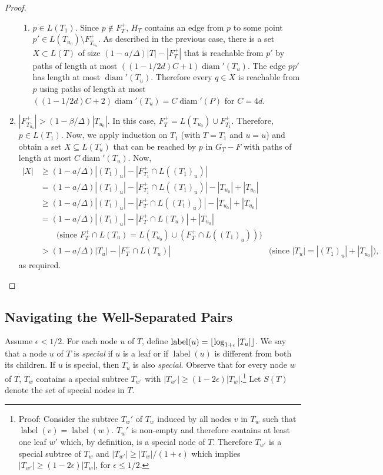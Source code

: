 \documentclass{patmorin}
\DeclareMathOperator{\diam}{diam}
\DeclareMathOperator{\lbl}{label}
\begin{document}
\begin{proof}
\begin{enumerate}
\begin{enumerate}
      \item $p\in L(T_1)$. Since $p\not\in F^+_T$, $H_T$ contains an edge
      from $p$ to some point $p'\in L(T_{u_0})\setminus F^+_{T_{u_0}}$.
      As described in the previous case, there is a set $X\subset
      L(T)$ of size $(1-a/\Delta)|T|-|F^+_{T}|$ that is reachable
      from $p'$ by paths of length at most $((1-1/2d)C+1)\diam'(T_u)$.
      The edge $pp'$ has length at most $\diam'(T_u)$. Therefore every
      $q\in X$ is reachable from $p$ using paths of length at most
      $((1-1/2d)C+2)\diam'(T_u) = C\diam'(P)$ for $C= 4d$.
    \end{enumerate}

    \item $|F^+_{T_{u_0}}|> (1-\beta/\Delta)|T_{u_0}|$.  In this case,
     $F^+_T= L(T_{u_0})\cup F^+_{T_1}$.
     Therefore, $p\in L(T_1)$.  Now, we apply
     induction on $T_1$ (with $T=T_1$ and $u=u$) and obtain a set $X\subseteq L(T_u)$
     that can be reached by $p$ in $G_T-F$ with paths of length at most
     $C\diam'(T_u)$.  Now,
     \begin{align*}
       |X| & \ge (1-a/\Delta)|(T_1)_u| - |F^+_{T_1}\cap L((T_1)_u)| \\
           & =   (1-a/\Delta)|(T_1)_u| - |F^+_{T_1}\cap L((T_1)_u)|
                    - |T_{u_0}| + |T_{u_0}| \\
           & \ge   (1-a/\Delta)|(T_1)_u| - |F^+_{T}\cap L((T_1)_u)|
                    - |T_{u_0}| + |T_{u_0}| \\
           & =   (1-a/\Delta)|(T_1)_u| - |F^+_{T}\cap L(T_u)| + |T_{u_0}| \\
             & \qquad \text{(since $F^+_T\cap L(T_u)= L(T_{u_0}) \cup (F^+_T\cap L((T_1)_u))$)} \\
           & >   (1-a/\Delta)|T_u| - |F^+_{T}\cap L(T_u)| 
             & \text{(since $|T_u|=|(T_1)_u|+|T_{u_0}|$),} 
     \end{align*}
     as required. \qedhere
    \end{enumerate}
\end{proof}


\subsection{Navigating the Well-Separated Pairs}

Assume $\epsilon < 1/2$.  For each node $u$ of $T$, define
$\lbl(u)=\floor{\log_{1+\epsilon}|T_u|}$. We say that a node $u$ of $T$
is \emph{special} if $u$ is a leaf or if $\lbl(u)$ is different from both
its children.  If $u$ is special, then $T_u$ is also \emph{special}.
Observe that for every node $w$ of $T$, $T_w$ contains a special
subtree $T_{w'}$ with $|T_{w'}|\ge (1-2\epsilon)|T_w|$.\footnote{Proof:
Consider the subtree $T_w'$ of $T_w$ induced by all nodes $v$ in $T_w$
such that $\lbl(v)=\lbl(w)$. $T_w'$ is non-empty and therefore contains
at least one leaf $w'$ which, by definition, is a special node of $T$.
Therefore $T_{w'}$ is a special subtree of $T_w$ and $|T_{w'}|\ge
|T_w|/(1+\epsilon)$ which implies $|T_{w'}|\ge (1-2\epsilon)|T_w|$, for
$\epsilon \le 1/2$.}  Let $S(T)$ denote the set of special nodes in $T$.
\end{document}
